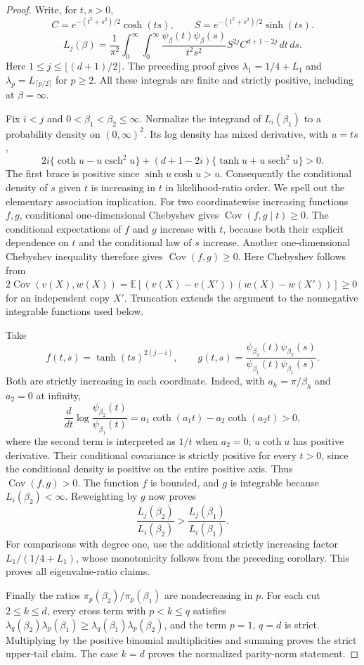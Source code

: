 \documentclass[11pt]{article}
\newcommand{\E}{\mathbb E}\newcommand{\R}{\mathbb R}
\begin{document}
\begin{proof}
Write, for $t,s>0$,
\[
 C=e^{-(t^2+s^2)/2}\cosh(ts),\qquad
 S=e^{-(t^2+s^2)/2}\sinh(ts).
\]
\[
 L_j(\beta)=\frac1{\pi^2}\int_0^\infty\!\int_0^\infty
 \frac{\psi_\beta(t)\psi_\beta(s)}{t^2s^2}
       S^{2j}C^{d+1-2j}\,dt\,ds.
                                                               \tag{K2}
\]
Here $1\le j\le\lfloor(d+1)/2\rfloor$. The preceding proof gives
$\lambda_1=1/4+L_1$ and
$\lambda_p=L_{\lceil p/2\rceil}$ for $p\ge2$.
All these integrals are finite and strictly positive, including at
$\beta=\infty$.

Fix $i<j$ and $0<\beta_1<\beta_2\le\infty$. Normalize the integrand
of $L_i(\beta_1)$ to a probability density on $(0,\infty)^2$.
Its log density has mixed derivative, with $u=ts$,
\[
 2i\{\coth u-u\operatorname{csch}^2u\}
 +(d+1-2i)\{\tanh u+u\operatorname{sech}^2u\}>0.       \tag{K3}
\]
The first brace is positive since $\sinh u\cosh u>u$.
Consequently the conditional density of $s$ given $t$ is increasing
in $t$ in likelihood-ratio order. We spell out the elementary
association implication. For two coordinatewise increasing functions
$f,g$, conditional one-dimensional Chebyshev gives
$\operatorname{Cov}(f,g\mid t)\ge0$.
The conditional expectations of $f$ and $g$ increase with $t$,
because both their explicit dependence on $t$ and the conditional
law of $s$ increase. Another one-dimensional Chebyshev inequality
therefore gives $\operatorname{Cov}(f,g)\ge0$.
Here Chebyshev follows from
$2\operatorname{Cov}(v(X),w(X))
=\E[(v(X)-v(X'))(w(X)-w(X'))]\ge0$ for an independent copy $X'$.
Truncation extends the argument to the nonnegative integrable
functions used below.

Take
\[
 f(t,s)=\tanh(ts)^{2(j-i)},\qquad
 g(t,s)=\frac{\psi_{\beta_2}(t)\psi_{\beta_2}(s)}
                 {\psi_{\beta_1}(t)\psi_{\beta_1}(s)}.
\]
Both are strictly increasing in each coordinate. Indeed, with
$a_h=\pi/\beta_h$ and $a_2=0$ at infinity,
\[
 \frac d{dt}\log\frac{\psi_{\beta_2}(t)}{\psi_{\beta_1}(t)}
       =a_1\coth(a_1t)-a_2\coth(a_2t)>0,
\]
where the second term is interpreted as $1/t$ when $a_2=0$;
$u\coth u$ has positive derivative. Their conditional covariance
is strictly positive for every $t>0$, since the conditional density
is positive on the entire positive axis. Thus $\operatorname{Cov}(f,g)>0$.
The function $f$ is bounded, and $g$ is integrable because
$L_i(\beta_2)<\infty$. Reweighting by $g$ now proves
\[
             \frac{L_j(\beta_2)}{L_i(\beta_2)}
                >\frac{L_j(\beta_1)}{L_i(\beta_1)}.     \tag{K4}
\]
For comparisons with degree one, use the additional strictly
increasing factor $L_1/(1/4+L_1)$, whose monotonicity follows from
the preceding corollary. This proves all eigenvalue-ratio claims.

Finally the ratios $\pi_p(\beta_2)/\pi_p(\beta_1)$ are
nondecreasing in $p$. For each cut $2\le k\le d$, every cross term
with $p<k\le q$ satisfies
$\lambda_q(\beta_2)\lambda_p(\beta_1)
\ge\lambda_q(\beta_1)\lambda_p(\beta_2)$, and the term
$p=1$, $q=d$ is strict. Multiplying by the positive binomial
multiplicities and summing proves the strict upper-tail claim.
The case $k=d$ proves the normalized parity-norm statement.
\end{proof}
\end{document}

